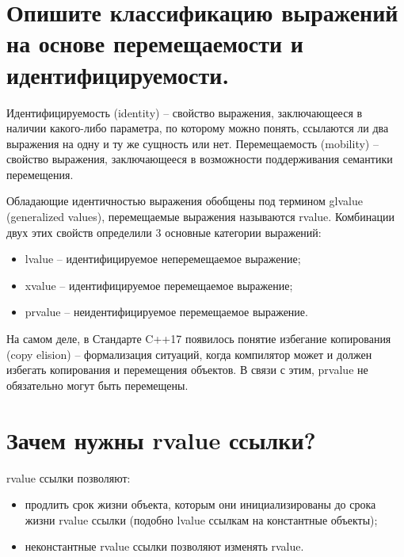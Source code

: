 \documentclass[a4paper,12pt]{article}	%
\begin{document}
\newpage

\section{Опишите классификацию выражений на основе перемещаемости и идентифицируемости.}

	Идентифицируемость (identity) -- свойство выражения, заключающееся в наличии какого-либо параметра, по которому можно понять, ссылаются ли два выражения на одну и ту же сущность или нет. Перемещаемость (mobility) -- свойство выражения, заключающееся в возможности поддерживания семантики перемещения.
	
	Обладающие идентичностью выражения обобщены под термином glvalue (generalized values), перемещаемые выражения называются rvalue. Комбинации двух этих свойств определили 3 основные категории выражений:
	
	\begin{itemize}
	
	\item lvalue -- идентифицируемое неперемещаемое выражение;
	
	\item xvalue -- идентифицируемое перемещаемое выражение;
	
	\item prvalue -- неидентифицируемое перемещаемое выражение.	
	
	\end{itemize}

	На самом деле, в Стандарте C++17 появилось понятие избегание копирования (copy elision) -- формализация ситуаций, когда компилятор может и должен избегать копирования и перемещения объектов. В связи с этим, prvalue не обязательно могут быть перемещены.

\newpage

\section{Зачем нужны rvalue ссылки?}

	rvalue ссылки позволяют:
	
	\begin{itemize}
	
	\item продлить срок жизни объекта, которым они инициализированы до срока жизни rvalue ссылки (подобно lvalue ссылкам на константные объекты);
	
	\item неконстантные rvalue ссылки позволяют изменять rvalue.
	
	\end{itemize}		
	
\end{document}
